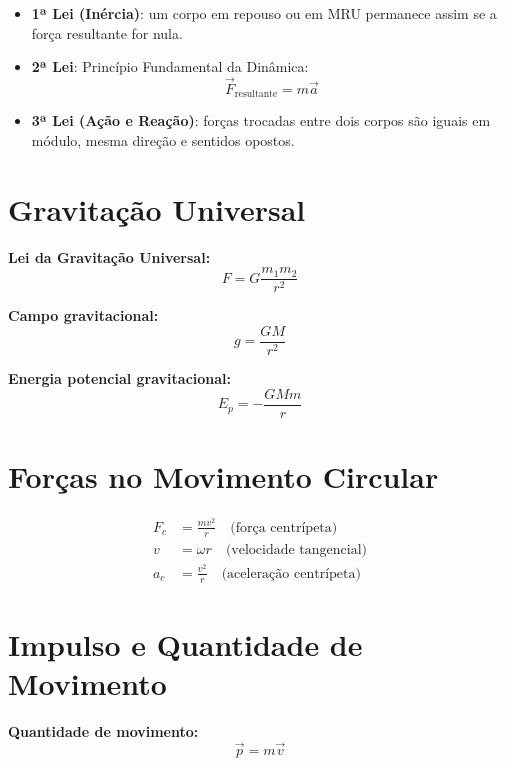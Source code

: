 \documentclass[a4paper,12pt]{article}
\begin{document}
\begin{multicols}{2}
\begin{itemize}
  \item \textbf{1ª Lei (Inércia)}: um corpo em repouso ou em MRU permanece assim se a força resultante for nula.
  \item \textbf{2ª Lei}: Princ\'ipio Fundamental da Din\^amica:
  \begin{equation*}
    \vec{F}_{\text{resultante}} = m \vec{a}
  \end{equation*}
  \item \textbf{3ª Lei (Ação e Reação)}: forças trocadas entre dois corpos são iguais em módulo, mesma direção e sentidos opostos.
\end{itemize}

\section{Gravitação Universal}

\textbf{Lei da Gravitação Universal:}
\begin{equation*}
  F = G \frac{m_1 m_2}{r^2}
\end{equation*}

\textbf{Campo gravitacional:}
\begin{equation*}
  g = \frac{G M}{r^2}
\end{equation*}

\textbf{Energia potencial gravitacional:}
\begin{equation*}
  E_p = -\frac{G M m}{r}
\end{equation*}

\section{Forças no Movimento Circular}

\begin{align*}
  F_c &= \frac{m v^2}{r} \quad \text{(força centrípeta)} \\
  v &= \omega r \quad \text{(velocidade tangencial)} \\
  a_c &= \frac{v^2}{r} \quad \text{(aceleração centrípeta)}
\end{align*}

\section{Impulso e Quantidade de Movimento}

\textbf{Quantidade de movimento:}
\begin{equation*}
  \vec{p} = m \vec{v}
\end{equation*}


\end{multicols}
\end{document}
